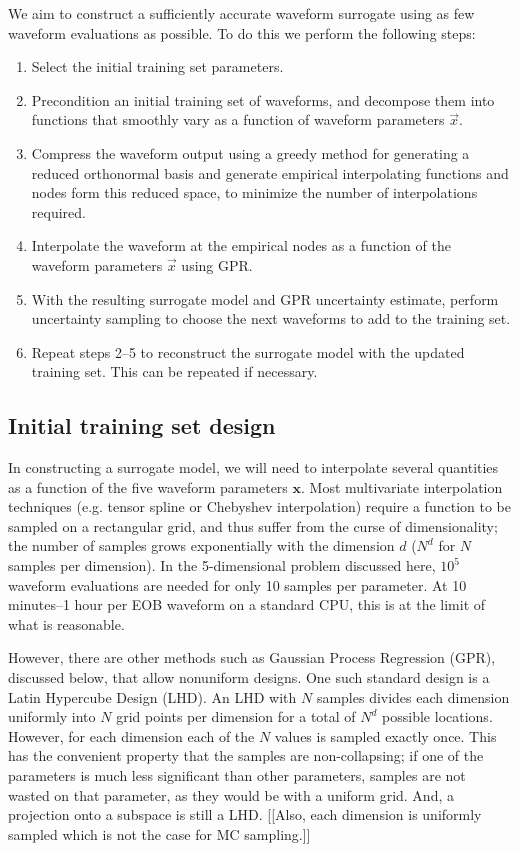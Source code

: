 \documentclass[prd,aps,letter,twocolumn,floatfix,notitlepage]{revtex4-1}
\begin{document}
We aim to construct a sufficiently accurate waveform surrogate using as few waveform evaluations as possible.
To do this we perform the following steps:
\begin{enumerate}
\item Select the initial training set parameters.

\item Precondition an initial training set of waveforms, and decompose them into functions that smoothly vary
as a function of waveform parameters $\vec x$. 

\item Compress the waveform output using a greedy method for generating a reduced orthonormal basis and 
generate empirical interpolating functions and nodes form this reduced space, to minimize the number of interpolations
required.

\item Interpolate the waveform at the empirical nodes as a function of the waveform parameters $\vec x$ using GPR.

\item With the resulting surrogate model and GPR uncertainty estimate, perform uncertainty sampling to choose the 
next waveforms to add to the training set.

\item Repeat steps 2--5 to reconstruct the surrogate model with the updated training set. This can be repeated
if necessary.
\end{enumerate}

\subsection{Initial training set design}

In constructing a surrogate model, we will need to interpolate several quantities as a function of the five
waveform parameters ${\bm x}$.
Most multivariate interpolation techniques (e.g. tensor spline or Chebyshev interpolation) 
require a function to be sampled on a rectangular grid, and thus suffer from the curse of dimensionality; 
the number of samples grows exponentially with the dimension $d$ ($N^d$ for $N$ samples per dimension).
In the 5-dimensional problem discussed here, $10^5$ waveform evaluations are needed for only 10 samples per parameter.
At 10 minutes--1 hour per EOB waveform on a standard CPU, this is at the limit of what is reasonable.

However, there are other methods such as Gaussian Process Regression (GPR), discussed below, that allow nonuniform designs.
One such standard design is a Latin Hypercube Design (LHD). An LHD with $N$ samples divides each dimension uniformly into $N$
grid points per dimension for a total of $N^d$ possible locations. However, for each dimension each of the $N$ values is sampled 
exactly once. This has the convenient property that the samples are non-collapsing; if one of the parameters is much less 
significant than other parameters, samples are not wasted on that parameter, as they would be with a uniform grid. And, a projection
onto a subspace is still a LHD. [[Also, each dimension is uniformly sampled which is not the case for MC sampling.]]
\end{document}
